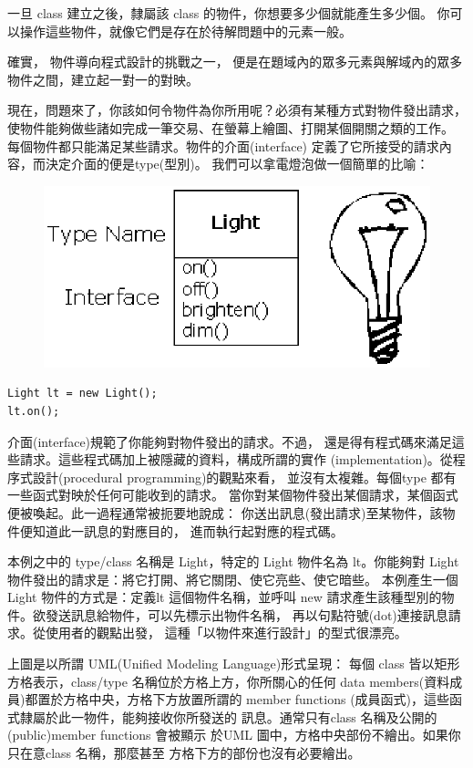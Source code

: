 一旦 class 建立之後，隸屬該 class 的物件，你想要多少個就能產生多少個。
你可以操作這些物件，就像它們是存在於待解問題中的元素一般。

確實， 物件導向程式設計的挑戰之一，
便是在題域內的眾多元素與解域內的眾多物件之間，建立起一對一的對映。

現在，問題來了，你該如何令物件為你所用呢？必須有某種方式對物件發出請求，
使物件能夠做些諸如完成一筆交易、在螢幕上繪圖、打開某個開關之類的工作。
每個物件都只能滿足某些請求。物件的介面(interface)
定義了它所接受的請求內容，而決定介面的便是type(型別)。
我們可以拿電燈泡做一個簡單的比喻：

\begin{figure}[htbp]
\centering
\includegraphics[scale=0.8]{eps/TIJ203.eps}
\end{figure}

\begin{verbatim}
Light lt = new Light();
lt.on();
\end{verbatim}

介面(interface)規範了你能夠對物件發出的請求。不過，
還是得有程式碼來滿足這些請求。這些程式碼加上被隱藏的資料，構成所謂的實作
(implementation)。從程序式設計(procedural programming)的觀點來看，
並沒有太複雜。每個type 都有一些函式對映於任何可能收到的請求。
當你對某個物件發出某個請求，某個函式便被喚起。此一過程通常被扼要地說成：
你送出訊息(發出請求)至某物件，該物件便知道此一訊息的對應目的，
進而執行起對應的程式碼。

本例之中的 type/class 名稱是 Light，特定的 Light 物件名為 lt。你能夠對
Light 物件發出的請求是：將它打開、將它關閉、使它亮些、使它暗些。
本例產生一個Light 物件的方式是：定義lt 這個物件名稱，並呼叫
new 請求產生該種型別的物件。欲發送訊息給物件，可以先標示出物件名稱，
再以句點符號(dot)連接訊息請求。從使用者的觀點出發，
這種「以物件來進行設計」的型式很漂亮。

上圖是以所謂 UML(Unified Modeling Language)形式呈現：
每個 class 皆以矩形方格表示，class/type 名稱位於方格上方，你所關心的任何 data
members(資料成員)都置於方格中央，方格下方放置所謂的 member functions
(成員函式)，這些函式隸屬於此一物件，能夠接收你所發送的
訊息。通常只有class 名稱及公開的(public)member functions 會被顯示
於UML 圖中，方格中央部份不繪出。如果你只在意class 名稱，那麼甚至
方格下方的部份也沒有必要繪出。
